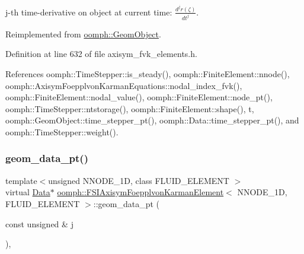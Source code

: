 j-\/th time-\/derivative on object at current time\+: $ \frac{d^{j} r(\zeta)}{dt^j} $. 



Reimplemented from \hyperlink{classoomph_1_1GeomObject_aa46469e491d25eda8dbe213f07152974}{oomph\+::\+Geom\+Object}.



Definition at line 632 of file axisym\+\_\+fvk\+\_\+elements.\+h.



References oomph\+::\+Time\+Stepper\+::is\+\_\+steady(), oomph\+::\+Finite\+Element\+::nnode(), oomph\+::\+Axisym\+Foepplvon\+Karman\+Equations\+::nodal\+\_\+index\+\_\+fvk(), oomph\+::\+Finite\+Element\+::nodal\+\_\+value(), oomph\+::\+Finite\+Element\+::node\+\_\+pt(), oomph\+::\+Time\+Stepper\+::ntstorage(), oomph\+::\+Finite\+Element\+::shape(), t, oomph\+::\+Geom\+Object\+::time\+\_\+stepper\+\_\+pt(), oomph\+::\+Data\+::time\+\_\+stepper\+\_\+pt(), and oomph\+::\+Time\+Stepper\+::weight().

\mbox{\label{classoomph_1_1FSIAxisymFoepplvonKarmanElement_a4aa016e0164dad96f66ff98af98889e6}} 
\subsubsection{\texorpdfstring{geom\+\_\+data\+\_\+pt()}{geom\_data\_pt()}}
{\footnotesize\ttfamily template$<$unsigned N\+N\+O\+D\+E\+\_\+1D, class F\+L\+U\+I\+D\+\_\+\+E\+L\+E\+M\+E\+NT $>$ \\
virtual \hyperlink{classoomph_1_1Data}{Data}$\ast$ \hyperlink{classoomph_1_1FSIAxisymFoepplvonKarmanElement}{oomph\+::\+F\+S\+I\+Axisym\+Foepplvon\+Karman\+Element}$<$ N\+N\+O\+D\+E\+\_\+1D, F\+L\+U\+I\+D\+\_\+\+E\+L\+E\+M\+E\+NT $>$\+::geom\+\_\+data\+\_\+pt (\begin{DoxyParamCaption}\item[{const unsigned \&}]{j }\end{DoxyParamCaption})\hspace{0.3cm}{\ttfamily [inline]}, {\ttfamily [virtual]}}



